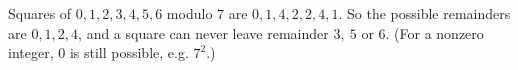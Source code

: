 Squares of $0,1,2,3,4,5,6$ modulo $7$ are $0,1,4,2,2,4,1$. So the possible remainders are $0,1,2,4$, and a square can never leave remainder $\boxed{3,\ 5\text{ or }6}$. (For a nonzero integer, $0$ is still possible, e.g. $7^2$.)
